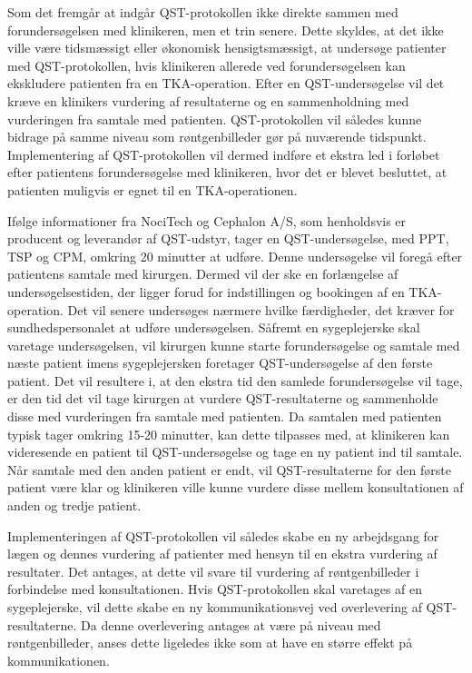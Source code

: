 Som det fremgår at  indgår QST-protokollen ikke direkte sammen med forundersøgelsen med klinikeren, men et trin senere. Dette skyldes, at det ikke ville være tidsmæssigt eller økonomisk hensigtsmæssigt, at undersøge patienter med QST-protokollen, hvis klinikeren allerede ved forundersøgelsen kan ekskludere patienten fra en TKA-operation. Efter en QST-undersøgelse vil det kræve en klinikers vurdering af resultaterne og en sammenholdning med vurderingen fra samtale med patienten. QST-protokollen vil således kunne bidrage på samme niveau som røntgenbilleder gør på nuværende tidspunkt. Implementering af QST-protokollen vil dermed indføre et ekstra led i forløbet efter patientens forundersøgelse med klinikeren, hvor det er blevet besluttet, at patienten muligvis er egnet til en TKA-operationen. 

Ifølge informationer fra NociTech og Cephalon A/S, som henholdsvis er producent og leverandør af QST-udstyr, tager en QST-undersøgelse, med PPT, TSP og CPM, omkring 20 minutter at udføre. Denne undersøgelse vil foregå efter patientens samtale med kirurgen. Dermed vil der ske en forlængelse af undersøgelsestiden, der ligger forud for indstillingen og bookingen af en TKA-operation.  Det vil senere undersøges nærmere hvilke færdigheder, det kræver for sundhedspersonalet at udføre undersøgelsen. Såfremt en sygeplejerske skal varetage undersøgelsen, vil kirurgen kunne starte forundersøgelse og samtale med næste patient imens sygeplejersken foretager QST-undersøgelse af den første patient. Det vil resultere i, at den ekstra tid den samlede forundersøgelse vil tage, er den tid det vil tage kirurgen at vurdere QST-resultaterne og sammenholde disse med vurderingen fra samtale med patienten. Da samtalen med patienten typisk tager omkring 15-20 minutter,  kan dette tilpasses med, at klinikeren kan videresende en patient til QST-undersøgelse og tage en ny patient ind til samtale. Når samtale med den anden patient er endt, vil QST-resultaterne for den første patient være klar og klinikeren ville kunne vurdere disse mellem konsultationen af anden og tredje patient.

Implementeringen af QST-protokollen vil således skabe en ny arbejdsgang for lægen og dennes vurdering af patienter med hensyn til en ekstra vurdering af resultater. Det antages, at dette vil svare til vurdering af røntgenbilleder i forbindelse med konsultationen.
Hvis QST-protokollen skal varetages af en sygeplejerske, vil dette skabe en ny kommunikationsvej ved overlevering af QST-resultaterne. Da denne overlevering antages at være på niveau med røntgenbilleder, anses dette ligeledes ikke som at have en større effekt på kommunikationen. 


